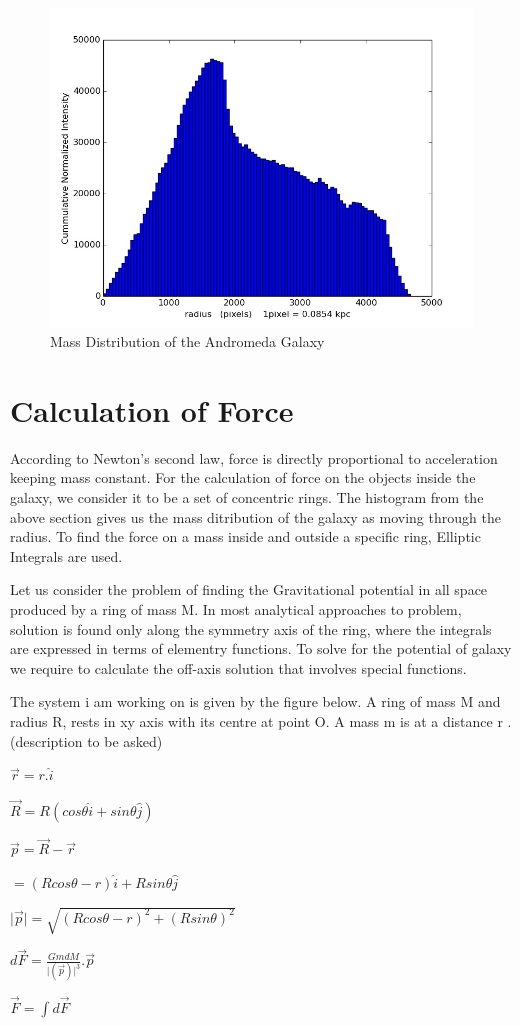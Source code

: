 \begin{enumerate}
\begin{verbatim}
\end{verbatim}

\begin{figure} [h]
\centering
\includegraphics[scale=0.35]{histogram.jpg}
\caption{Mass Distribution of the Andromeda Galaxy }
\end{figure}

\end{enumerate}

\section{Calculation of Force}

According to Newton's second law, force is directly proportional to acceleration keeping mass constant. For the calculation of force on the objects inside the galaxy, we consider it to be a set of concentric rings. The histogram from the above section gives us the mass ditribution of the galaxy as moving through the radius. To find the force on a mass inside and outside a specific ring, Elliptic Integrals are used. 

Let us consider the problem of finding the Gravitational potential in all space produced by a ring of mass M. In most analytical approaches to problem, solution is found only along the symmetry axis of the ring, where the integrals are expressed in terms of elementry functions. To solve for the potential of galaxy we require to calculate the off-axis solution that involves special functions. 
 
The system i am working on is given by the figure below. A ring of mass M and radius R, rests in xy axis with its centre at point O. A mass m is at a distance r .(description to be asked)

$ \vec{r} = r.\hat{i} $

$ \vec{R} = R(cos\theta \hat{i} + sin\theta \hat{j} ) $

$ \vec{p} = \vec{R}-\vec{r} $

$ = (Rcos\theta-r)\hat{i}+Rsin\theta\hat{j} $

$ \vert \vec{p}\vert = \sqrt{(Rcos\theta-r)^{2} + (Rsin\theta )^{2} }$

$ d\vec{F}= \frac{GmdM}{\vert (\vec{p})\vert ^{3}} . \vec{p} $

$ \vec{F} = \int {d\vec{F}} $